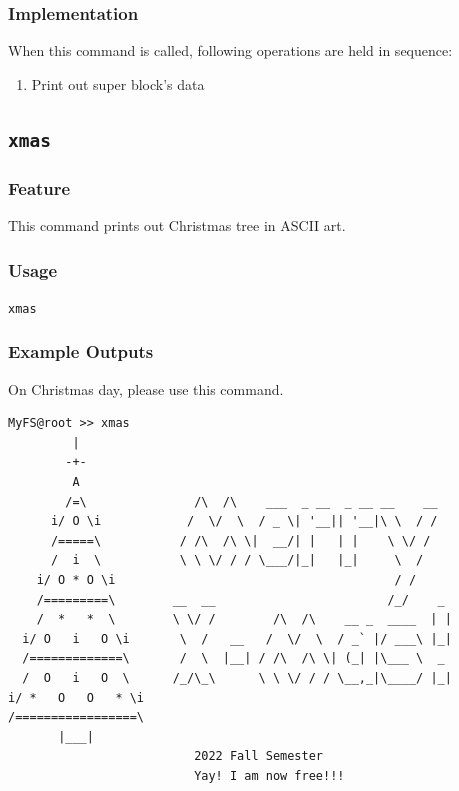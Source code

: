 \documentclass{homework}
\begin{document}
\subsubsection{Implementation}
When this command is called, following operations are held in sequence:
\begin{enumerate}
    \item Print out super block's data
\end{enumerate}

\pagebreak
\subsection{\texttt{xmas}}
\subsubsection{Feature}
This command prints out Christmas tree in ASCII art.
\subsubsection{Usage}
\begin{center}
\texttt{xmas}
\end{center}

\subsubsection{Example Outputs}
On Christmas day, please use this command.
\\
\begin{center}
\begin{code}
\begin{verbatim}
MyFS@root >> xmas
         |
        -+-
         A
        /=\               /\  /\    ___  _ __  _ __ __    __
      i/ O \i            /  \/  \  / _ \| '__|| '__|\ \  / /
      /=====\           / /\  /\ \|  __/| |   | |    \ \/ /
      /  i  \           \ \ \/ / / \___/|_|   |_|     \  /
    i/ O * O \i                                       / /
    /=========\        __  __                        /_/    _
    /  *   *  \        \ \/ /        /\  /\    __ _  ____  | |
  i/ O   i   O \i       \  /   __   /  \/  \  / _` |/ ___\ |_|
  /=============\       /  \  |__| / /\  /\ \| (_| |\___ \  _
  /  O   i   O  \      /_/\_\      \ \ \/ / / \__,_|\____/ |_|
i/ *   O   O   * \i
/=================\
       |___|
                          2022 Fall Semester
                          Yay! I am now free!!!
\end{verbatim}
\end{code}
\end{center}
\end{document}
